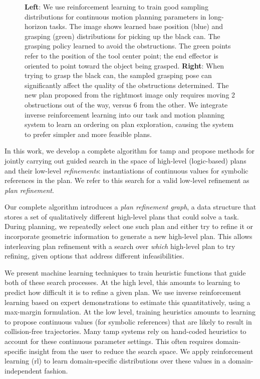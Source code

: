 \begin{figure}[t]
  \caption{\small{\textbf{Left}: We use reinforcement learning to train good sampling distributions for
      continuous motion planning parameters in long-horizon tasks.
      The image shows learned base position (blue) and
      grasping (green) distributions for picking up the black can. The grasping
      policy learned to avoid the obstructions. The green points refer
      to the position of the tool center point; the end effector is oriented
      to point toward the object being grasped. \textbf{Right}: When trying to grasp the black can, the sampled grasping pose can
      significantly affect the quality of the obstructions determined. The new plan proposed from the rightmost image only
      requires moving 2 obstructions out of the way, versus 6 from the other. We integrate inverse reinforcement learning into our task and
      motion planning system to learn an ordering on plan exploration, causing the system to prefer simpler and more feasible plans.}}
  \label{fig:cover}
\end{figure}

In this work, we develop a complete algorithm for {\sc tamp} and propose
methods for jointly carrying out guided search in the space of
high-level (logic-based) plans and their low-level
\emph{refinements}: instantiations of continuous values for
symbolic references in the plan. We refer to this search for a valid low-level
refinement as \emph{plan refinement}.

Our complete algorithm introduces
a \emph{plan refinement graph}, a data structure that stores a
set of qualitatively different high-level plans that could solve a task.
During planning, we repeatedly select one such plan and either try to
refine it or incorporate geometric information to generate a new high-level
plan. This allows interleaving plan refinement with a
search over \emph{which} high-level plan to try refining, given options
that address different infeasibilities.

We present machine learning techniques to train heuristic functions that guide
both of these search processes. At the high level, this amounts to learning
to predict how difficult it is to refine a given plan. We use inverse reinforcement learning
based on expert demonstrations to estimate this quantitatively, using a max-margin formulation.
At the low level, training heuristics amounts to
learning to propose continuous values (for symbolic references) that are likely to result in
collision-free trajectories. Many {\sc tamp} systems rely on hand-coded heuristics to
account for these continuous parameter settings. This often requires
domain-specific insight from the user to reduce the search space.
We apply reinforcement learning ({\sc rl}) to learn domain-specific distributions
over these values in a domain-independent fashion.

